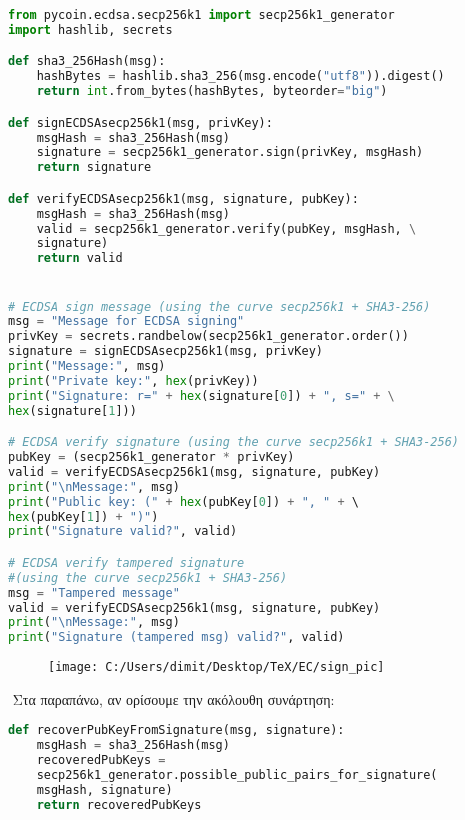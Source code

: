 \documentclass[oneside,a4paper]{article}
\begin{document}
\vspace*{0.3cm}
\begin{lstlisting}[language=Python]
from pycoin.ecdsa.secp256k1 import secp256k1_generator
import hashlib, secrets

def sha3_256Hash(msg):
	hashBytes = hashlib.sha3_256(msg.encode("utf8")).digest()
	return int.from_bytes(hashBytes, byteorder="big")

def signECDSAsecp256k1(msg, privKey):
	msgHash = sha3_256Hash(msg)
	signature = secp256k1_generator.sign(privKey, msgHash)
	return signature

def verifyECDSAsecp256k1(msg, signature, pubKey):
	msgHash = sha3_256Hash(msg)
	valid = secp256k1_generator.verify(pubKey, msgHash, \
	signature)
	return valid


# ECDSA sign message (using the curve secp256k1 + SHA3-256)
msg = "Message for ECDSA signing"
privKey = secrets.randbelow(secp256k1_generator.order())
signature = signECDSAsecp256k1(msg, privKey)
print("Message:", msg)
print("Private key:", hex(privKey))
print("Signature: r=" + hex(signature[0]) + ", s=" + \
hex(signature[1]))

# ECDSA verify signature (using the curve secp256k1 + SHA3-256)
pubKey = (secp256k1_generator * privKey)   	
valid = verifyECDSAsecp256k1(msg, signature, pubKey)
print("\nMessage:", msg)
print("Public key: (" + hex(pubKey[0]) + ", " + \ 
hex(pubKey[1]) + ")")
print("Signature valid?", valid)

# ECDSA verify tampered signature 
#(using the curve secp256k1 + SHA3-256)
msg = "Tampered message"
valid = verifyECDSAsecp256k1(msg, signature, pubKey)
print("\nMessage:", msg)
print("Signature (tampered msg) valid?", valid)
\end{lstlisting}

\begin{figure}[H]
	\centering
	\texttt{[image: C:/Users/dimit/Desktop/TeX/EC/sign\_pic]}
\end{figure}

$ $\newline
Στα παραπάνω, αν ορίσουμε την ακόλουθη συνάρτηση:

\vspace*{0.3cm}
\begin{lstlisting}[language = Python]
def recoverPubKeyFromSignature(msg, signature):
    msgHash = sha3_256Hash(msg)
    recoveredPubKeys = 
	secp256k1_generator.possible_public_pairs_for_signature(
	msgHash, signature)
    return recoveredPubKeys
\end{lstlisting}
\end{document}

